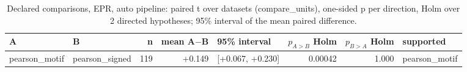 \begin{table}[H]\centering\small
\caption{Declared comparisons, EPR, auto pipeline: paired t over datasets (compare\_units), one-sided p per direction, Holm over 2 directed hypotheses; 95\% interval of the mean paired difference.}
\begin{tabular}{llrrlrrl}\toprule
A & B & n & mean A$-$B & 95\% interval & $p_{A>B}$ Holm & $p_{B>A}$ Holm & supported \\ \midrule
pearson\_motif & pearson\_signed & 119 & +0.149 & [+0.067, +0.230] & 0.00042 & 1.000 & pearson\_motif \\
\bottomrule\end{tabular}\end{table}
